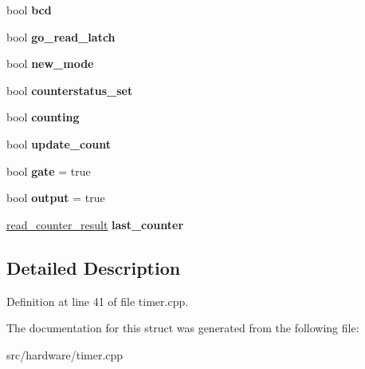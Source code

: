 \begin{DoxyCompactItemize}
\item 
\hypertarget{structPIT__Block_a8ddc522280bb994ea634aa855470836e}{bool {\bfseries bcd}}\label{structPIT__Block_a8ddc522280bb994ea634aa855470836e}

\item 
\hypertarget{structPIT__Block_a7a715f03e1acc563935446865c6ff565}{bool {\bfseries go\-\_\-read\-\_\-latch}}\label{structPIT__Block_a7a715f03e1acc563935446865c6ff565}

\item 
\hypertarget{structPIT__Block_acf24bddaa36c23e46f27c9b7127707a3}{bool {\bfseries new\-\_\-mode}}\label{structPIT__Block_acf24bddaa36c23e46f27c9b7127707a3}

\item 
\hypertarget{structPIT__Block_a048abc116ac6c60acfc407a6274a69ae}{bool {\bfseries counterstatus\-\_\-set}}\label{structPIT__Block_a048abc116ac6c60acfc407a6274a69ae}

\item 
\hypertarget{structPIT__Block_a22b10292f287bf33a2c5b456dce9bddc}{bool {\bfseries counting}}\label{structPIT__Block_a22b10292f287bf33a2c5b456dce9bddc}

\item 
\hypertarget{structPIT__Block_a81813382e0d2d0d1c79cf97713ae68df}{bool {\bfseries update\-\_\-count}}\label{structPIT__Block_a81813382e0d2d0d1c79cf97713ae68df}

\item 
\hypertarget{structPIT__Block_a4207ed587f5c51acadcbea33ef324368}{bool {\bfseries gate} = true}\label{structPIT__Block_a4207ed587f5c51acadcbea33ef324368}

\item 
\hypertarget{structPIT__Block_aba70d7b051f82e064e7da0193f225e43}{bool {\bfseries output} = true}\label{structPIT__Block_aba70d7b051f82e064e7da0193f225e43}

\item 
\hypertarget{structPIT__Block_aa531b7f189242b699b2655b1069b2527}{\hyperlink{structPIT__Block_1_1read__counter__result}{read\-\_\-counter\-\_\-result} {\bfseries last\-\_\-counter}}\label{structPIT__Block_aa531b7f189242b699b2655b1069b2527}

\end{DoxyCompactItemize}


\subsection{Detailed Description}


Definition at line 41 of file timer.\-cpp.



The documentation for this struct was generated from the following file\-:\begin{DoxyCompactItemize}
\item 
src/hardware/timer.\-cpp\end{DoxyCompactItemize}
